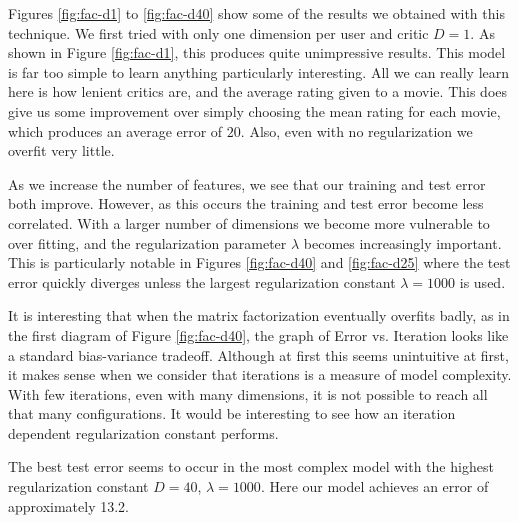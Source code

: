 \documentclass[10.5pt]{article}
\newcommand{\matrixtesterror}{13.2}
\begin{document}
Figures \ref{fig:fac-d1} to \ref{fig:fac-d40} show some of the results we 
obtained with this technique. We first tried with only one dimension 
per user and critic $D=1$. As shown in Figure  \ref{fig:fac-d1}, this 
produces quite unimpressive results. This model is far too 
simple to learn anything particularly interesting. All we can really learn here 
is how lenient critics are, and the average rating given to a movie. This does 
give us some improvement over simply choosing the mean rating for each movie, 
which produces an average error of $20$. Also, even with no regularization we 
overfit very little.

As we increase the number of features, we see that our training and test error 
both improve. However, as this occurs the training and test error become less 
correlated. With a larger number of dimensions we become more vulnerable to 
over fitting, and the regularization parameter $\lambda$ becomes 
increasingly important. This is particularly notable in Figures 
\ref{fig:fac-d40} and \ref{fig:fac-d25} where the test error quickly diverges
unless the largest regularization constant $\lambda = 1000$ is used.

It is interesting that when the matrix factorization eventually overfits 
badly, as in the first diagram of Figure \ref{fig:fac-d40}, the graph of 
Error vs. Iteration looks like a standard bias-variance tradeoff. Although 
at first this seems unintuitive at first, it makes sense when we consider that 
iterations is a measure of model complexity. With few iterations, even with 
many dimensions, it is not possible to reach all that many configurations. 
It would be interesting to see how an iteration dependent regularization 
constant performs. 

The best test error seems to occur in the most complex model with the highest 
regularization constant $D=40$, $\lambda = 1000$. Here our model achieves an 
error of approximately \matrixtesterror.
\end{document}
